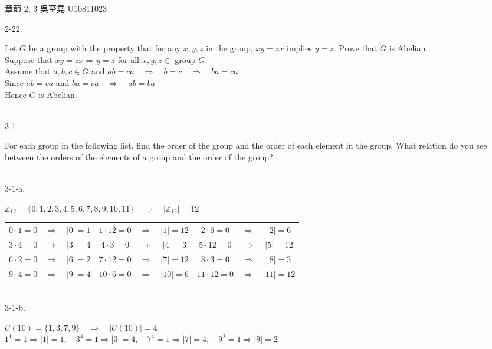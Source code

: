 \documentclass[12pt]{book}
\author{andersonwu2000}
\begin{document}
\begin{CJK}{UTF8}{bsmi}

\hfill 章節 2, 3 吳至堯 U10811023

2-22. \begin{minipage}[t]{\dimexpr\linewidth-2em}
Let $G$ be a group with the property that for any $x, y, z$ in the group, $xy = zx$ implies $y = z$. Prove that $G$ is Abelian. \\
Suppose that $xy=zx\Rightarrow y=z$ for all $x,y,z\in$ group $G$ \\
Assume that $a,b,c\in G$ and $ab=ca\quad\Rightarrow\quad b=c\quad\Rightarrow\quad ba=ca$ \\
Since $ab=ca$ and $ba=ca\quad\Rightarrow\quad ab=ba$ \\
Hence $G$ is Abelian.
\end{minipage}\\

3-1. \begin{minipage}[t]{\dimexpr\linewidth-2em}
For each group in the following list, find the order of the group and the order of each element in the group. What relation do you see between the orders of the elements of a group and the order of the group?
\end{minipage}\\

3-1-a. \begin{minipage}[t]{\dimexpr\linewidth-2em}
$\mathbb{Z}_{12}=\{0,1,2,3,4,5,6,7,8,9,10,11\}\quad\Rightarrow\quad|\mathbb{Z}_{12}|=12$ \\
\begin{tabular}{ccc|ccc|ccc}
    $0\cdot1=0$ & $\Rightarrow$ & $|0|=1$ & $1\cdot12=0$ & $\Rightarrow$ & $|1|=12$ & $2\cdot6=0$ & $\Rightarrow$ & $|2|=6$ \\
    $3\cdot4=0$ & $\Rightarrow$ & $|3|=4$ & $4\cdot3=0$ & $\Rightarrow$ & $|4|=3$ & $5\cdot12=0$ & $\Rightarrow$ & $|5|=12$ \\
    $6\cdot2=0$ & $\Rightarrow$ & $|6|=2$ & $7\cdot12=0$ & $\Rightarrow$ & $|7|=12$ & $8\cdot3=0$ & $\Rightarrow$ & $|8|=3$ \\
    $9\cdot4=0$ & $\Rightarrow$ & $|9|=4$ & $10\cdot6=0$ & $\Rightarrow$ & $|10|=6$ & $11\cdot12=0$ & $\Rightarrow$ & $|11|=12$ \\
\end{tabular}
\end{minipage}\\

3-1-b. \begin{minipage}[t]{\dimexpr\linewidth-2em}
$U(10)=\{1,3,7,9\}\quad\Rightarrow\quad|U(10)|=4$ \\
$1^1=1 \Rightarrow |1|=1,\quad 3^4=1 \Rightarrow |3|=4,\quad 7^4=1 \Rightarrow |7|=4,\quad 9^2=1 \Rightarrow |9|=2$ \\
\end{minipage}\\


\end{CJK}
\end{document}
